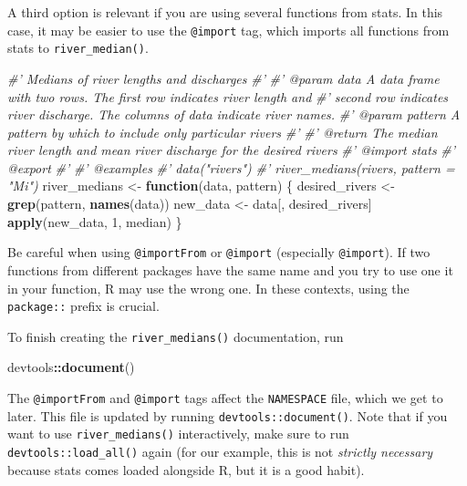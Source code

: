 \documentclass[
]{book}
\newenvironment{Shaded}{\begin{snugshade}}{\end{snugshade}}
\newcommand{\CommentTok}[1]{\textcolor[rgb]{0.56,0.35,0.01}{\textit{#1}}}
\newcommand{\ControlFlowTok}[1]{\textcolor[rgb]{0.13,0.29,0.53}{\textbf{#1}}}
\newcommand{\DecValTok}[1]{\textcolor[rgb]{0.00,0.00,0.81}{#1}}
\newcommand{\KeywordTok}[1]{\textcolor[rgb]{0.13,0.29,0.53}{\textbf{#1}}}
\newcommand{\NormalTok}[1]{#1}
\newcommand{\OperatorTok}[1]{\textcolor[rgb]{0.81,0.36,0.00}{\textbf{#1}}}
\newcommand{\StringTok}[1]{\textcolor[rgb]{0.31,0.60,0.02}{#1}}
\begin{document}
A third option is relevant if you are using several functions from stats. In this case, it may be easier to use the \texttt{@import} tag, which imports all functions from stats to \texttt{river\_median()}.

\begin{Shaded}
\begin{Highlighting}[]
\CommentTok{#' Medians of river lengths and discharges}
\CommentTok{#'}
\CommentTok{#' @param data A data frame with two rows. The first row indicates river length and}
\CommentTok{#'   second row indicates river discharge. The columns of data indicate river names.}
\CommentTok{#' @param pattern A pattern by which to include only particular rivers}
\CommentTok{#'}
\CommentTok{#' @return The median river length and mean river discharge for the desired rivers}
\CommentTok{#' @import stats}
\CommentTok{#' @export}
\CommentTok{#'}
\CommentTok{#' @examples}
\CommentTok{#' data("rivers")}
\CommentTok{#' river_medians(rivers, pattern = "Mi")}
\NormalTok{river_medians <-}\StringTok{ }\ControlFlowTok{function}\NormalTok{(data, pattern) \{}
\NormalTok{  desired_rivers <-}\StringTok{ }\KeywordTok{grep}\NormalTok{(pattern, }\KeywordTok{names}\NormalTok{(data))}
\NormalTok{  new_data <-}\StringTok{ }\NormalTok{data[, desired_rivers]}
  \KeywordTok{apply}\NormalTok{(new_data, }\DecValTok{1}\NormalTok{, median)}
\NormalTok{\}}
\end{Highlighting}
\end{Shaded}

Be careful when using \texttt{@importFrom} or \texttt{@import} (especially \texttt{@import}). If two functions from different packages have the same name and you try to use one it in your function, R may use the wrong one. In these contexts, using the \texttt{package::} prefix is crucial.

To finish creating the \texttt{river\_medians()} documentation, run

\begin{Shaded}
\begin{Highlighting}[]
\NormalTok{devtools}\OperatorTok{::}\KeywordTok{document}\NormalTok{()}
\end{Highlighting}
\end{Shaded}

The \texttt{@importFrom} and \texttt{@import} tags affect the \texttt{NAMESPACE} file, which we get to later. This file is updated by running \texttt{devtools::document()}. Note that if you want to use \texttt{river\_medians()} interactively, make sure to run \texttt{devtools::load\_all()} again (for our example, this is not \emph{strictly necessary} because stats comes loaded alongside R, but it is a good habit).
\end{document}
